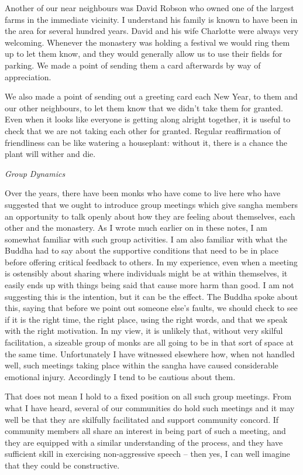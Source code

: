 Another of our near neighbours was David Robson who owned one of the
largest farms in the immediate vicinity. I understand his family is
known to have been in the area for several hundred years. David and his
wife Charlotte were always very welcoming. Whenever the monastery was
holding a festival we would ring them up to let them know, and they
would generally allow us to use their fields for parking. We made a
point of sending them a card afterwards by way of appreciation.

We also made a point of sending out a greeting card each New Year, to
them and our other neighbours, to let them know that we didn't take them
for granted. Even when it looks like everyone is getting along alright
together, it is useful to check that we are not taking each other for
granted. Regular reaffirmation of friendliness can be like watering a
houseplant: without it, there is a chance the plant will wither and die.

\emph{Group Dynamics}

Over the years, there have been monks who have come to live here who
have suggested that we ought to introduce group meetings which give
sangha members an opportunity to talk openly about how they are feeling
about themselves, each other and the monastery. As I wrote much earlier
on in these notes, I am somewhat familiar with such group activities. I
am also familiar with what the Buddha had to say about the supportive
conditions that need to be in place before offering critical feedback to
others. In my experience, even when a meeting is ostensibly about
sharing where individuals might be at within themselves, it easily ends
up with things being said that cause more harm than good. I am not
suggesting this is the intention, but it can be the effect. The Buddha
spoke about this, saying that before we point out someone else's faults,
we should check to see if it is the right time, the right place, using
the right words, and that we speak with the right motivation. In my
view, it is unlikely that, without very skilful facilitation, a sizeable
group of monks are all going to be in that sort of space at the same
time. Unfortunately I have witnessed elsewhere how, when not handled
well, such meetings taking place within the sangha have caused
considerable emotional injury. Accordingly I tend to be cautious about
them.

That does not mean I hold to a fixed position on all such group
meetings. From what I have heard, several of our communities do hold
such meetings and it may well be that they are skilfully facilitated and
support community concord. If community members all share an interest in
being part of such a meeting, and they are equipped with a similar
understanding of the process, and they have sufficient skill in
exercising non-aggressive speech -- then yes, I can well imagine that
they could be constructive.

